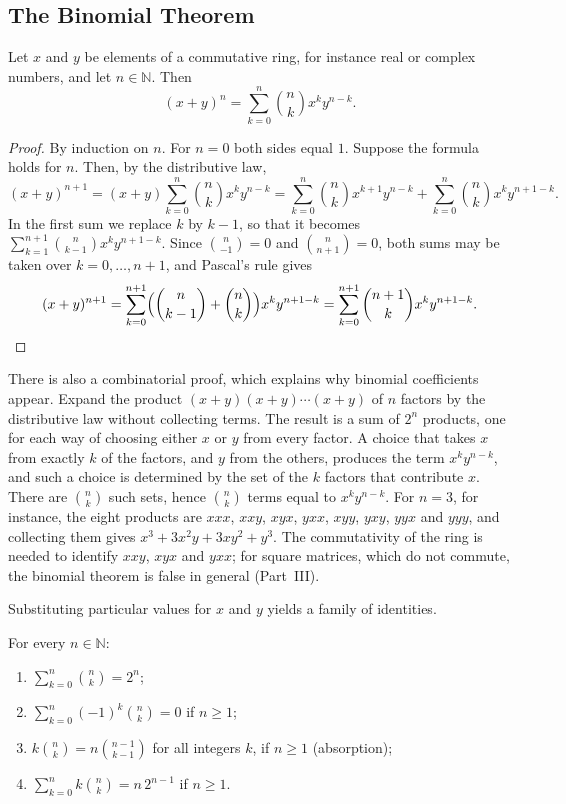 \subsection{The Binomial Theorem}

\begin{theorem}
\label{thm:binomial}
Let $x$ and $y$ be elements of a commutative ring, for instance real or complex numbers, and let $n\in\mathbb N$. Then
\[
(x+y)^n=\sum_{k=0}^{n}\binom nk x^ky^{n-k}.
\]
\end{theorem}

\begin{proof}
By induction on $n$. For $n=0$ both sides equal $1$. Suppose the formula holds for $n$. Then, by the distributive law,
\[
(x+y)^{n+1}=(x+y)\sum_{k=0}^{n}\binom nk x^ky^{n-k}=\sum_{k=0}^{n}\binom nk x^{k+1}y^{n-k}+\sum_{k=0}^{n}\binom nk x^ky^{n+1-k}.
\]
In the first sum we replace $k$ by $k-1$, so that it becomes $\sum_{k=1}^{n+1}\binom n{k-1}x^ky^{n+1-k}$. Since $\binom n{-1}=0$ and $\binom n{n+1}=0$, both sums may be taken over $k=0,\ldots,n+1$, and Pascal's rule gives
\[
(x+y)^{n+1}=\sum_{k=0}^{n+1}\Bigl(\binom n{k-1}+\binom nk\Bigr)x^ky^{n+1-k}=\sum_{k=0}^{n+1}\binom{n+1}{k}x^ky^{n+1-k}.
\]
\end{proof}

There is also a combinatorial proof, which explains why binomial coefficients appear. Expand the product $(x+y)(x+y)\cdots(x+y)$ of $n$ factors by the distributive law without collecting terms. The result is a sum of $2^n$ products, one for each way of choosing either $x$ or $y$ from every factor. A choice that takes $x$ from exactly $k$ of the factors, and $y$ from the others, produces the term $x^ky^{n-k}$, and such a choice is determined by the set of the $k$ factors that contribute $x$. There are $\binom nk$ such sets, hence $\binom nk$ terms equal to $x^ky^{n-k}$. For $n=3$, for instance, the eight products are $xxx$, $xxy$, $xyx$, $yxx$, $xyy$, $yxy$, $yyx$ and $yyy$, and collecting them gives $x^3+3x^2y+3xy^2+y^3$. The commutativity of the ring is needed to identify $xxy$, $xyx$ and $yxx$; for square matrices, which do not commute, the binomial theorem is false in general (Part~III).

Substituting particular values for $x$ and $y$ yields a family of identities.

\begin{corollary}
\label{cor:binomial-sums}
For every $n\in\mathbb N$:
\begin{enumerate}
\item $\sum_{k=0}^{n}\binom nk=2^n$;
\item $\sum_{k=0}^{n}(-1)^k\binom nk=0$ if $n\ge1$;
\item $k\binom nk=n\binom{n-1}{k-1}$ for all integers $k$, if $n\ge1$ \quad(absorption);
\item $\sum_{k=0}^{n}k\binom nk=n\,2^{n-1}$ if $n\ge1$.
\end{enumerate}
\end{corollary}

